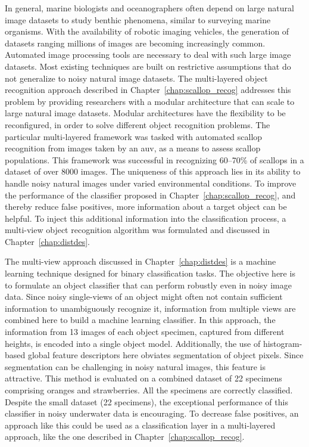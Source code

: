 \documentclass {udthesis}
\begin{document}
In general, marine biologists and oceanographers often depend on large natural image datasets to study benthic phenomena, similar to surveying marine organisms. With the availability of robotic imaging vehicles, the generation of datasets ranging millions of images are becoming increasingly common. Automated image processing tools are necessary to deal with such large image datasets. Most existing techniques are built on restrictive assumptions that do not generalize to noisy natural image datasets. The multi-layered object recognition approach described in Chapter~\ref{chap:scallop_recog} addresses this problem by providing researchers with a modular architecture that can scale to large natural image datasets. Modular architectures have the flexibility to be reconfigured, in order to solve different object recognition problems.
The particular multi-layered framework was tasked with automated scallop recognition from images taken by an \gls{auv}, as a means to assess scallop populations. 
This framework was successful in recognizing 60--70\% of scallops in a dataset of over 8000 images.
The uniqueness of this approach lies in its ability to handle noisy natural images under varied environmental conditions.
To improve the performance of the classifier proposed in Chapter~\ref{chap:scallop_recog}, and thereby reduce false positives, more information about a target object can be helpful.
To inject this additional information into the classification process, a multi-view object recognition algorithm was formulated and discussed in Chapter~\ref{chap:distdes}.

The multi-view approach discussed in Chapter~\ref{chap:distdes} is a machine learning 
technique designed for binary classification tasks. 
The objective here is to formulate an object classifier that can perform robustly even in noisy image data.
Since noisy single-views of an object might often not contain sufficient information to unambiguously recognize it, information from multiple views are combined 
here to build a machine learning classifier. 
In this approach, the information from 13 images of each object specimen, captured from different heights, is encoded into a single object model.
Additionally, the use of histogram-based global feature descriptors here obviates segmentation of object pixels. Since segmentation can be challenging in noisy natural images, this feature is attractive. This method is evaluated on a combined dataset of 22 specimens comprising oranges and strawberries.
All the specimens are correctly classified. Despite the small dataset (22 specimens), the exceptional performance of this classifier in noisy underwater data is encouraging. To decrease false positives, an approach like this could be used as a classification layer in a multi-layered approach, like the one described in Chapter~\ref{chap:scallop_recog}.
\end{document}

